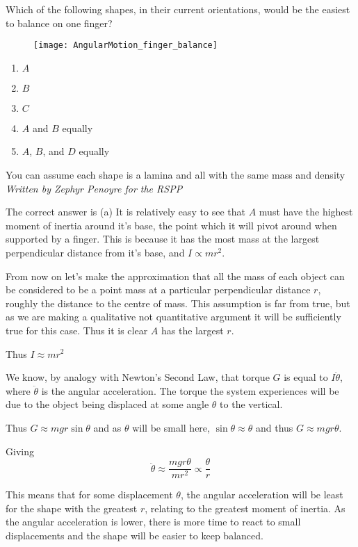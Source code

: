 \begin{hint} 
{Which of the following shapes, in their current orientations, would be the easiest to balance on one finger?
\begin{figure} [h]
\centering
\texttt{[image: AngularMotion\_finger\_balance]}
\label{fig:AngularMotion_finger_balance}
\end{figure}
\begin{enumerate}
	\item $A$
	\item $B$
	\item $C$
	\item $A$ and $B$ equally
	\item $A$, $B$, and $D$ equally
\end{enumerate}}
{You can assume each shape is a lamina and all with the same mass and density}
{\textit{Written by Zephyr Penoyre for the RSPP}}
{The correct answer is (a)
It is relatively easy to see that $A$ must have the highest moment of inertia around it's base, the point which it will pivot around when supported by a finger. This is because it has the most mass at the largest perpendicular distance from it's base, and $I \propto m r^2$.

From now on let's make the approximation that all the mass of each object can be considered to be a point mass at a particular perpendicular distance $r$, roughly the distance to the centre of mass. This assumption is far from true,  but as we are making a qualitative not quantitative argument it will be sufficiently true for this case. Thus it is clear $A$ has the largest $r$.

Thus $I \approx mr^2$

We know, by analogy with Newton's Second Law, that torque $G$ is equal to $I \ddot{\theta}$, where $ \ddot{\theta}$ is the angular acceleration. The torque the system experiences will be due to the object being displaced at some angle $\theta$ to the vertical. 

Thus $G \approx mgr \sin{\theta}$ and as $\theta$ will be small here, $\sin{\theta} \approx {\theta}$ and thus $G \approx mgr\theta$.

Giving
\begin{equation*}
\ddot{\theta} \approx \dfrac{mgr\theta}{mr^2} \propto \dfrac{\theta}{r}
\end{equation*}

This means that for some displacement $\theta$, the angular acceleration will be least for the shape with the greatest $r$, relating to the greatest moment of inertia. As the angular acceleration is lower, there is more time to react to small displacements and the shape will be easier to keep balanced.
}
\end{hint}